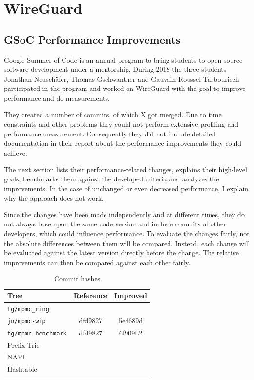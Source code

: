 \documentclass[IN,11pt,twoside,openright,master,english]{tumthesis}
\begin{document}
\section{WireGuard}

	\subsection{GSoC Performance Improvements}
	
	Google Summer of Code is an annual program to bring students to open-source software development under a mentorship. During 2018 the three students Jonathan Neuschäfer, Thomas Gschwantner and Gauvain  Roussel-Tarbouriech participated in the program and worked on WireGuard with the goal to improve performance and do measurements. %
	
	They created a number of commits, of which X got merged. Due to time constraints and other problems they could not perform extensive profiling and performance measurement. Consequently they did not include detailed documentation in their report about the performance improvements they could achieve.
	
	The next section lists their performance-related changes, explains their high-level goals, benchmarks them against the developed criteria and analyzes the improvements. In the case of unchanged or even decreased performance, I explain why the approach does not work.
	
	Since the changes have been made independently and at different times, they do not always base upon the same code version and include commits of other developers, which could influence performance. To evaluate the changes fairly, not the absolute differences between them will be compared. Instead, each change will be evaluated against the latest version directly before the change. The relative improvements can then be compared against each other fairly.
	
	\begin{table}[h]
		\centering
		\begin{tabular}{l c c}
			Tree & Reference & Improved \\ 
			\hline 
			\texttt{tg/mpmc\_ring} &  &  \\ 
			\texttt{jn/mpmc-wip} & dfd9827 &  5e4689d\\ 
			\texttt{tg/mpmc-benchmark} & dfd9827  & 6f909b2 \\ 
			Prefix-Trie & & \\
			NAPI & & \\
			Hashtable & & \\
		\end{tabular}
		\caption{Commit hashes}
		\label{tab:gsoc-commits}
	\end{table}
	
\end{document}
